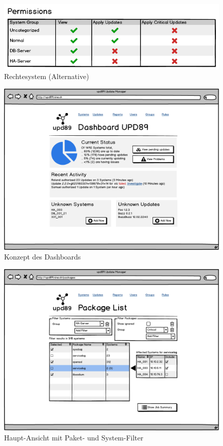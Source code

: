 \begin{figure}[H]
	\centering
	\includegraphics[width=\linewidth]{files/mockups/permission_2}
	\caption{Rechtesystem (Alternative)}
	\label{fig:design:permission_2}
\end{figure}

\begin{figure}[H]
	\centering
	\includegraphics[width=\linewidth]{files/mockups/dashboard}
	\caption{Konzept des Dashboards}
	\label{fig:design:dashboard_mockup}
\end{figure}

\begin{figure}[H]
	\centering
	\includegraphics[width=\linewidth]{files/mockups/combo_view}
	\caption{Haupt-Ansicht mit Paket- und System-Filter}
	\label{fig:design:combo_view_mockup}
\end{figure}

